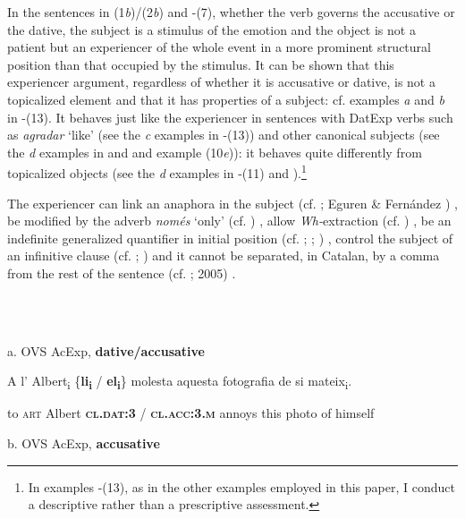 \documentclass[output=paper,modfonts,nonflat]{langsci/langscibook}
\begin{document}
In the sentences in (1\textit{b})/(2\textit{b}) and -(7), whether the verb governs the accusative or the dative, the subject is a stimulus of the emotion and the object is not a patient but an experiencer of the whole event in a more prominent structural position than that occupied by the stimulus. It can be shown that this experiencer argument, regardless of whether it is accusative or dative, is not a topicalized element and that it has properties of a subject: cf. examples \textit{a} and \textit{b} in -(13). It behaves just like the experiencer in sentences with DatExp verbs such as \textit{agradar} ‘like’ (see the \textit{c} examples in -(13)) and other canonical subjects (see the \textit{d} examples in  and  and example (10\textit{e})): it behaves quite differently from topicalized objects (see the \textit{d} examples in -(11) and ).\footnote{In examples -(13), as in the other examples employed in this paper, I conduct a descriptive rather than a prescriptive assessment.}

The experiencer can link an anaphora in the subject (cf. \citealt{Demonte1989}; Eguren \& Fernández \citealt{Soriano2004}) , be modified by the adverb \textit{només} ‘only’ (cf. \citealt{Cuervo1999}) , allow \textit{Wh-}extraction (cf. \citealt{BellettiRizzi1988}) , be an indefinite generalized quantifier in initial position (cf. \citealt{BellettiRizzi1988}; \citealt{Masullo1992}; \citealt{Cuervo1999}) , control the subject of an infinitive clause (cf. \citealt{Campos1999}; \citealt{Alsina2008})  and it cannot be separated, in Catalan, by a comma from the rest of the sentence (cf. \citealt{Ginebra2003}; 2005) .

\ea%
    \label{ex:key:8}
    \gll\\
        \\
    \glt
    \z

         a. OVS AcExp, \textbf{dative/accusative}

          A  l’    Albert\textsubscript{i} \{\textbf{li\textsubscript{i}}            / \textbf{el\textsubscript{i}}\}              molesta aquesta fotografia de si mateix\textsubscript{i}.

          to \textsc{art} Albert  \textbf{\textsc{cl.dat:3}} / \textbf{\textsc{cl.acc:3.m}} annoys this       photo        of himself

      b. OVS AcExp, \textbf{accusative}
\end{document}
